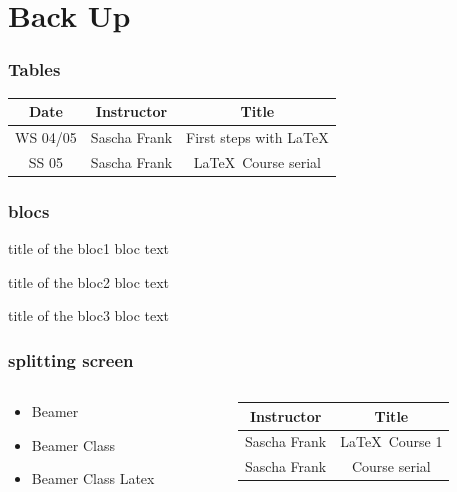 \documentclass{beamer}
\begin{document}
%
%
%

\section{Back Up}

\begin{frame}\frametitle{Tables}
\begin{tabular}{|c|c|c|}
\hline
\textbf{Date} & \textbf{Instructor} & \textbf{Title} \\
\hline
WS 04/05 & Sascha Frank & First steps with  \LaTeX  \\
\hline
SS 05 & Sascha Frank & \LaTeX \ Course serial \\
\hline
\end{tabular}
\end{frame}

\begin{frame}\frametitle{blocs}

\begin{block}{title of the bloc1}
bloc text
\end{block}

\begin{exampleblock}{title of the bloc2}
bloc text
\end{exampleblock}


\begin{alertblock}{title of the bloc3}
bloc text
\end{alertblock}

\end{frame}


\begin{frame}\frametitle{splitting screen}
\begin{columns}
\begin{column}{5cm}
\begin{itemize}
\item Beamer 
\item Beamer Class 
\item Beamer Class Latex 
\end{itemize}
\end{column}
\begin{column}{5cm}
\begin{tabular}{|c|c|}
\hline
\textbf{Instructor} & \textbf{Title} \\
\hline
Sascha Frank &  \LaTeX \ Course 1 \\
\hline
Sascha Frank &  Course serial  \\
\hline
\end{tabular}
\end{column}
\end{columns}
\end{frame}
\end{document}
